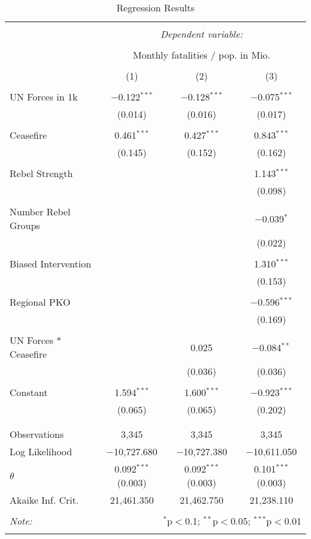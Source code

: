 
\begin{table}[!htbp] \centering 
  \caption{Regression Results} 
  \label{tab:table} 
\begin{tabular}{@{\extracolsep{5pt}}lccc} 
\\[-1.8ex]\hline 
\hline \\[-1.8ex] 
 & \multicolumn{3}{c}{\textit{Dependent variable:}} \\ 
\cline{2-4} 
\\[-1.8ex] & \multicolumn{3}{c}{Monthly fatalities / pop. in Mio.} \\ 
\\[-1.8ex] & (1) & (2) & (3)\\ 
\hline \\[-1.8ex] 
 UN Forces in 1k & $-$0.122$^{***}$ & $-$0.128$^{***}$ & $-$0.075$^{***}$ \\ 
  & (0.014) & (0.016) & (0.017) \\ 
  & & & \\ 
 Ceasefire & 0.461$^{***}$ & 0.427$^{***}$ & 0.843$^{***}$ \\ 
  & (0.145) & (0.152) & (0.162) \\ 
  & & & \\ 
 Rebel Strength &  &  & 1.143$^{***}$ \\ 
  &  &  & (0.098) \\ 
  & & & \\ 
 Number Rebel Groups &  &  & $-$0.039$^{*}$ \\ 
  &  &  & (0.022) \\ 
  & & & \\ 
 Biased Intervention &  &  & 1.310$^{***}$ \\ 
  &  &  & (0.153) \\ 
  & & & \\ 
 Regional PKO &  &  & $-$0.596$^{***}$ \\ 
  &  &  & (0.169) \\ 
  & & & \\ 
 UN Forces * Ceasefire &  & 0.025 & $-$0.084$^{**}$ \\ 
  &  & (0.036) & (0.036) \\ 
  & & & \\ 
 Constant & 1.594$^{***}$ & 1.600$^{***}$ & $-$0.923$^{***}$ \\ 
  & (0.065) & (0.065) & (0.202) \\ 
  & & & \\ 
\hline \\[-1.8ex] 
Observations & 3,345 & 3,345 & 3,345 \\ 
Log Likelihood & $-$10,727.680 & $-$10,727.380 & $-$10,611.050 \\ 
$\theta$ & 0.092$^{***}$  (0.003) & 0.092$^{***}$  (0.003) & 0.101$^{***}$  (0.003) \\ 
Akaike Inf. Crit. & 21,461.350 & 21,462.750 & 21,238.110 \\ 
\hline 
\hline \\[-1.8ex] 
\textit{Note:}  & \multicolumn{3}{r}{$^{*}$p$<$0.1; $^{**}$p$<$0.05; $^{***}$p$<$0.01} \\ 
 & \multicolumn{3}{r}{} \\ 
\end{tabular} 
\end{table} 
